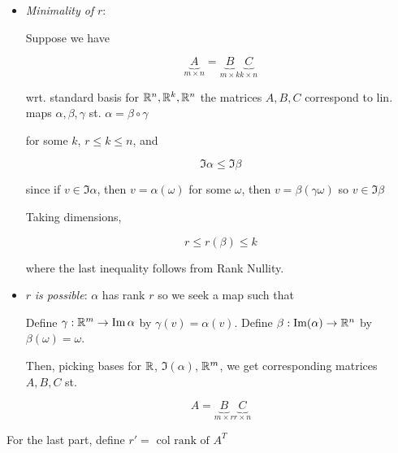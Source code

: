\documentclass[a4paper]{article}
\begin{document}
\begin{itemize}
	\item \emph{Minimality of} $ r $: 
	
	Suppose we have 
	
	\[ \underbrace{A}_{m \times n} = \underbrace{B}_{m \times k} \underbrace{C}_{k \times n} \]
	
	wrt. standard basis for $ \mathbb{R}^{n}, \mathbb{R}^{k}, \mathbb{R}^{n} $ the matrices $ A,B,C $ correspond to lin. maps $ \alpha, \beta, \gamma $ st. $ \alpha = \beta \circ \gamma $
	
	\begin{center}
	\end{center}

for some $ k $, $ r \leq k \leq n  $, and 

\[ \Im \alpha \leq \Im \beta \]

since if $ v \in \Im \alpha $, then $ v = \alpha(\omega) $ for some $ \omega $, then $ v = \beta(\gamma \omega) $ so $ v \in \Im \beta $

Taking dimensions,

\[ r \leq r(\beta) \leq k \]

where the last inequality follows from Rank Nullity. 

\item $ r $\emph{ is possible}: $ \alpha $ has rank $ r $ so we seek a map such that

\begin{center}
\end{center}

Define $ \gamma: \mathbb{R}^{m} \to \operatorname{Im} \alpha $ by $ \gamma(v) = \alpha(v) $. Define $ \beta : \operatorname{Im}(\alpha) \to \mathbb{R}^{n} $ by $ \beta(\omega) = \omega $.

Then, picking bases for $ \mathbb{R} $, $ \Im (\alpha) $, $ \mathbb{R}^{m} $, we get corresponding matrices $ A,B,C $ st.

\[ A = \underbrace{B}_{m \times r} \underbrace{C}_{r \times n} \]

	
\end{itemize}

For the last part, define $ r' = \text{ col rank of } A^{T} $
\end{document}
